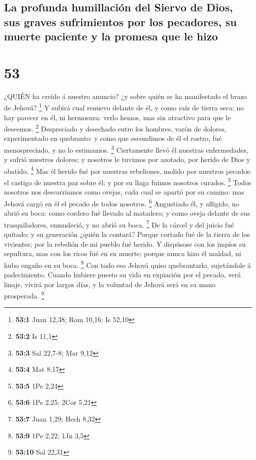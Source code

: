 \hypertarget{la-profunda-humillaciuxf3n-del-siervo-de-dios-sus-graves-sufrimientos-por-los-pecadores-su-muerte-paciente-y-la-promesa-que-le-hizo}{%
\subsection{La profunda humillación del Siervo de Dios, sus graves
sufrimientos por los pecadores, su muerte paciente y la promesa que le
hizo}\label{la-profunda-humillaciuxf3n-del-siervo-de-dios-sus-graves-sufrimientos-por-los-pecadores-su-muerte-paciente-y-la-promesa-que-le-hizo}}

\hypertarget{section-52}{%
\section{53}\label{section-52}}

 ¿QUIÉN ha creído á nuestro anuncio? ¿y sobre quién se ha
manifestado el brazo de Jehová? \footnote{\textbf{53:1} Juan 12,38; Rom
  10,16; Is 52,10}  Y subirá cual renuevo delante de él, y
como raíz de tierra seca: no hay parecer en él, ni hermosura: verlo
hemos, mas sin atractivo para que le deseemos. \footnote{\textbf{53:2}
  Is 11,1}  Despreciado y desechado entre los hombres, varón
de dolores, experimentado en quebranto: y como que escondimos de él el
rostro, fué menospreciado, y no lo estimamos. \footnote{\textbf{53:3}
  Sal 22,7-8; Mar 9,12}  Ciertamente llevó él nuestras
enfermedades, y sufrió nuestros dolores; y nosotros le tuvimos por
azotado, por herido de Dios y abatido. \footnote{\textbf{53:4} Mat 8,17}
 Mas él herido fué por nuestras rebeliones, molido por
nuestros pecados: el castigo de nuestra paz sobre él; y por su llaga
fuimos nosotros curados. \footnote{\textbf{53:5} 1Pe 2,24} 
Todos nosotros nos descarriamos como ovejas, cada cual se apartó por su
camino: mas Jehová cargó en él el pecado de todos nosotros. \footnote{\textbf{53:6}
  1Pe 2,25; 2Cor 5,21}  Angustiado él, y afligido, no abrió
su boca: como cordero fué llevado al matadero; y como oveja delante de
sus trasquiladores, enmudeció, y no abrió su boca. \footnote{\textbf{53:7}
  Juan 1,29; Hech 8,32}  De la cárcel y del juicio fué
quitado; y su generación ¿quién la contará? Porque cortado fué de la
tierra de los vivientes; por la rebelión de mi pueblo fué herido.
 Y dispúsose con los impíos su sepultura, mas con los ricos
fué en su muerte; porque nunca hizo él maldad, ni hubo engaño en su
boca. \footnote{\textbf{53:9} 1Pe 2,22; 1Jn 3,5}  Con todo
eso Jehová quiso quebrantarlo, sujetándole á padecimiento. Cuando
hubiere puesto su vida en expiación por el pecado, verá linaje, vivirá
por largos días, y la voluntad de Jehová será en su mano prosperada.
\footnote{\textbf{53:10} Sal 22,31}


